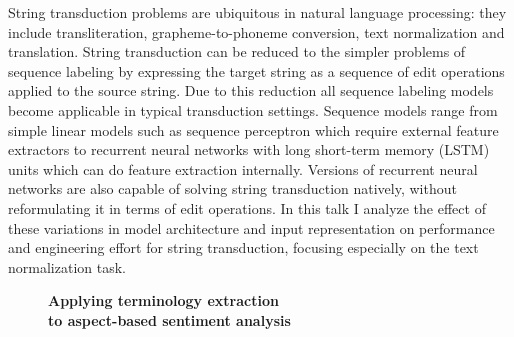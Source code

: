 \documentclass[10pt, a4paper, twopage, headinclude, footinclude, BCOR5mm]{scrartcl}
\begin{document}
\noindent
String transduction problems are ubiquitous in natural language processing: they include transliteration, grapheme-to-phoneme conversion, text normalization and translation. String transduction can be reduced to the simpler problems of sequence labeling by expressing the target string as a sequence of edit operations applied to the source string. Due to this reduction all sequence labeling models become applicable in typical transduction settings. Sequence models range from simple linear models such as sequence perceptron which require external feature extractors to recurrent neural networks with long short-term memory (LSTM) units which can do feature extraction internally. Versions of recurrent neural networks are also capable of solving string transduction natively, without reformulating it in terms of edit operations. In this talk I analyze the effect of these variations in model architecture and input representation on performance and engineering effort for string transduction, focusing especially on the text normalization task. 


\newpage

\begin{figure}[t!]
\centering
\large\textbf{Applying terminology extraction \\ to aspect-based sentiment analysis}
\vspace*{0.5cm}
\end{figure}


        \begin{table}[t!]
    \end{table}
\end{document}
